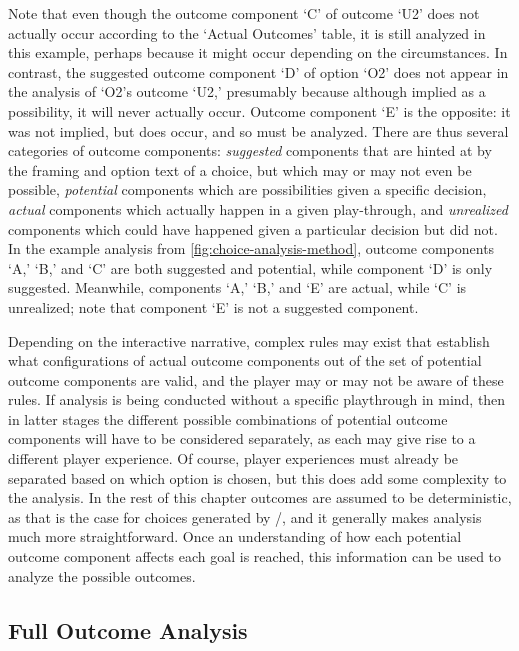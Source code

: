 Note that even though the outcome component `C' of outcome `U2' does not actually occur according to the `Actual Outcomes' table, it is still analyzed in this example, perhaps because it might occur depending on the circumstances.
%
In contrast, the suggested outcome component `D' of option `O2' does not appear in the analysis of `O2's outcome `U2,' presumably because although implied as a possibility, it will never actually occur.
%
Outcome component `E' is the opposite: it was not implied, but does occur, and so must be analyzed.
%
There are thus several categories of outcome components: \emph{suggested} components that are hinted at by the framing and option text of a choice, but which may or may not even be possible, \emph{potential} components which are possibilities given a specific decision, \emph{actual} components which actually happen in a given play-through, and \emph{unrealized} components which could have happened given a particular decision but did not.
%
In the example analysis from \cref{fig:choice-analysis-method}, outcome components `A,' `B,' and `C' are both suggested and potential, while component `D' is only suggested.
%
Meanwhile, components `A,' `B,' and `E' are actual, while `C' is unrealized; note that component `E' is not a suggested component.


Depending on the interactive narrative, complex rules may exist that establish what configurations of actual outcome components out of the set of potential outcome components are valid, and the player may or may not be aware of these rules.
%
If analysis is being conducted without a specific playthrough in mind, then in latter stages the different possible combinations of potential outcome components will have to be considered separately, as each may give rise to a different player experience.
%
Of course, player experiences must already be separated based on which option is chosen, but this does add some complexity to the analysis.
%
In the rest of this chapter outcomes are assumed to be deterministic, as that is the case for choices generated by \dunyazad/, and it generally makes analysis much more straightforward.
%
Once an understanding of how each potential outcome component affects each goal is reached, this information can be used to analyze the possible outcomes.


\subsection{Full Outcome Analysis}

\label{sec:cp-full-outcome-analysis}

